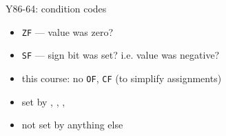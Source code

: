 \begin{frame}[label=ccodes,fragile]{Y86-64: condition codes}
\begin{itemize}
    \item \lstinline|ZF| --- value was zero?
    \item \lstinline|SF| --- sign bit was set? i.e. value was negative?
    \item this course: no \lstinline|OF|, \lstinline|CF| (to simplify assignments)
    \vspace{1cm}
    \item set by \addq, \subq, \andq, \xorq
    \item not set by anything else
\end{itemize}
\end{frame}

